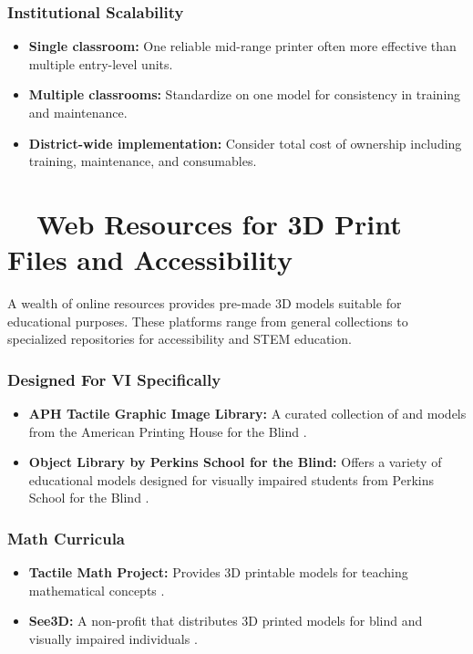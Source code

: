 \subsubsection{Institutional Scalability}
\begin{itemize}
	\item \textbf{Single classroom:} One reliable mid-range printer often more effective than multiple entry-level units.
	\item \textbf{Multiple classrooms:} Standardize on one model for consistency in training and maintenance.
	\item \textbf{District-wide implementation:} Consider total cost of ownership including training, maintenance, and consumables.
\end{itemize}

\section{~~Web Resources for 3D Print Files and Accessibility}\label{ch5:sec:web-resources}
A wealth of online resources provides pre-made 3D models suitable for educational purposes. These platforms range from general collections to specialized repositories for accessibility and STEM education.

\subsubsection{Designed For VI Specifically}
\begin{itemize}
	\item \textbf{APH Tactile Graphic Image Library:} A curated collection of  and models from the American Printing House for the Blind \supercite{APH}.
	\item \textbf{Object Library by Perkins School for the Blind:} Offers a variety of educational models designed for visually impaired students from Perkins School for the Blind \supercite{PerkinsElearning}.
\end{itemize}

\subsubsection{Math Curricula}
\begin{itemize}
	\item \textbf{Tactile Math Project:} Provides 3D printable models for teaching mathematical concepts \supercite{TactileMath}.
	\item \textbf{See3D:} A non-profit that distributes 3D printed models for blind and visually impaired individuals \supercite{See3D}.
\end{itemize}

